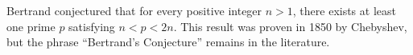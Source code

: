 \documentclass[12pt]{article}
\begin{document}
Bertrand conjectured that for every positive integer $n > 1$, there exists at least one prime $p$ satisfying $n < p < 2n$. This result was proven in 1850 by Chebyshev, but the phrase  ``Bertrand's Conjecture'' remains in the literature.
\end{document}
